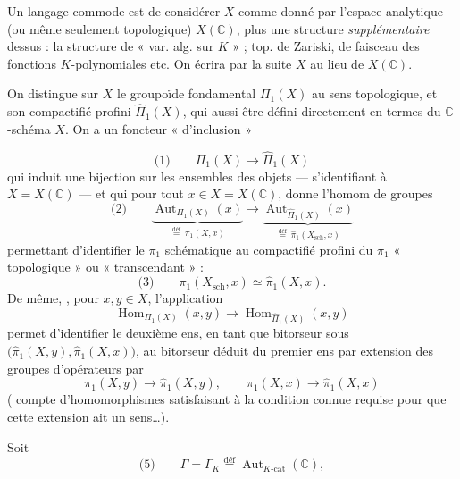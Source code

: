 \documentclass[11pt,a4paper]{article}
\begin{document}
Un langage commode est de considérer $X$ comme donné par l'espace analytique (ou même seulement topologique) $X(\mathbb{C})$, plus une structure \emph{supplémentaire} dessus : la structure de « var. alg. sur $K$ » ;  top. de Zariski, de faisceau des fonctions $K$-polynomiales etc. On écrira par la suite $X$ au lieu de $X(\mathbb{C})$.

On distingue sur $X$ le groupoïde fondamental $\Pi_1(X)$ au sens topologique, et son compactifié profini $\widehat{\Pi}_1(X)$, qui   aussi être défini directement en termes du $\mathbb{C}$-schéma $X$. On a un foncteur « d'inclusion »

\[
\text{(1)}\qquad \Pi_1(X) \longrightarrow \widehat{\Pi}_1(X)
\]
qui induit une bijection sur les ensembles des objets  — s'identifiant à $X = X(\mathbb{C})$ — et qui  pour tout $x \in X = X(\mathbb{C})$, donne l'homom de groupes
\[
\text{(2)}\qquad
\underbrace{\operatorname{Aut}_{\Pi_1(X)}(x)}_{\overset{\text{déf}}{=}\ \pi_1(X,x)} \longrightarrow \underbrace{\operatorname{Aut}_{\widehat{\Pi}_1(X)}(x)}_{\overset{\text{déf}}{=}\ \widehat{\pi}_1(X_{\mathrm{sch}},x)}
\]
permettant d'identifier le $\pi_1$ schématique au compactifié profini du $\pi_1$ « topologique » ou « transcendant » :
\[
\text{(3)}\qquad \pi_1(X_{\mathrm{sch}},x) \simeq \widehat{\pi}_1(X,x) .
\]
De même, , pour $x,y \in X$, l'application
\[
\operatorname{Hom}_{\Pi_1(X)}(x,y) \longrightarrow \operatorname{Hom}_{\widehat{\Pi}_1(X)}(x,y)
\]
permet d'identifier le deuxième ens, en tant que bitorseur sous $\bigl(\widehat{\pi}_1(X,y),\widehat{\pi}_1(X,x)\bigr)$, au bitorseur déduit  du premier ens par extension des groupes d'opérateurs par
\[
\pi_1(X,y) \to \widehat{\pi}_1(X,y), \qquad \pi_1(X,x) \to \widehat{\pi}_1(X,x)
\]
(\ill{} compte d'homomorphismes satisfaisant à la condition  connue requise pour que cette extension ait un sens…).


Soit
\[
\text{(5)}\qquad \Gamma = \Gamma_K \overset{\text{déf}}{=} \operatorname{Aut}_{K\text{-cat}}(\mathbb{C}),
\]
\end{document}
